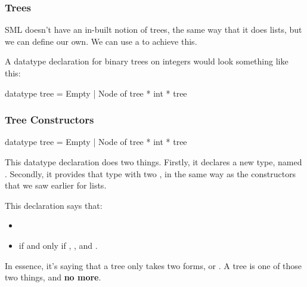 \documentclass[aspectratio=169]{beamer}
\begin{document}
\begin{frame}[fragile]
  \frametitle{Trees}

  SML doesn't have an in-built notion of trees, the same way that it does lists, but we can
  define our own. We can use a  to achieve this.

  \pause
  \vspace{\fill}


  \pause
  \vspace{\fill}

  A datatype declaration for binary trees on integers would look something like this:
  \begin{codeblock}
    datatype tree = Empty | Node of tree * int * tree
  \end{codeblock}
\end{frame}

\begin{frame}[fragile]
  \frametitle{Tree Constructors}

  \begin{codeblock}
    datatype tree = Empty | Node of tree * int * tree
  \end{codeblock}
  
  \vspace{\fill}

  This datatype declaration does two things. Firstly, it declares a new type, named .
  Secondly, it provides that type with two , in the same way as the constructors 
  that we saw earlier for lists.

  \pause
  \vspace{\fill}

  This declaration says that:
  \pause
  \begin{itemize}
    \item {} \pause
    \item {} if and only if , , and . \pause
  \end{itemize}

  \vspace{\fill}

  In essence, it's saying that a tree only takes two forms,  or . A tree
  is one of those two things, and \textbf{no more}.
\end{frame}
\end{document}
